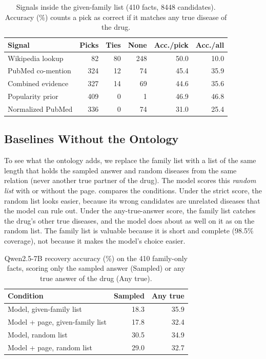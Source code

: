 \begin{table}[t]
\centering
\footnotesize
\setlength{\tabcolsep}{2.2pt}
\begin{tabular}{@{}lrrrrr@{}}
\toprule
Signal & Picks & Ties & None & Acc./pick & Acc./all \\
\midrule
Wikipedia lookup & 82 & 80 & 248 & 50.0 & 10.0 \\
PubMed co-mention & 324 & 12 & 74 & 45.4 & 35.9 \\
Combined evidence & 327 & 14 & 69 & 44.6 & 35.6 \\
Popularity prior & 409 & 0 & 1 & 46.9 & 46.8 \\
Normalized PubMed & 336 & 0 & 74 & 31.0 & 25.4 \\
\bottomrule
\end{tabular}
\caption{Signals inside the given-family list (410 facts, \num{8448} candidates). Accuracy (\%) counts a pick as correct if it matches any true disease of the drug.}
\label{tab:signals}
\end{table}

\subsection{Baselines Without the Ontology}

To see what the ontology adds, we replace the family list with a list of the same length that holds the sampled answer and random diseases from the same relation (never another true partner of the drug). The model scores this \emph{random list} with or without the page.  compares the conditions. Under the strict score, the random list looks easier, because its wrong candidates are unrelated diseases that the model can rule out. Under the any-true-answer score, the family list catches the drug's other true diseases, and the model does about as well on it as on the random list. The family list is valuable because it is short and complete (98.5\% coverage), not because it makes the model's choice easier.

\begin{table}[t]
\centering
\footnotesize
\setlength{\tabcolsep}{3pt}
\begin{tabular}{@{}lrr@{}}
\toprule
Condition & Sampled & Any true \\
\midrule
Model, given-family list & 18.3 & 35.9 \\
Model + page, given-family list & 17.8 & 32.4 \\
Model, random list & 30.5 & 34.9 \\
Model + page, random list & 29.0 & 32.7 \\
\bottomrule
\end{tabular}
\caption{Qwen2.5-7B recovery accuracy (\%) on the 410 family-only facts, scoring only the sampled answer (Sampled) or any true answer of the drug (Any true).}
\label{tab:scoring}
\end{table}

